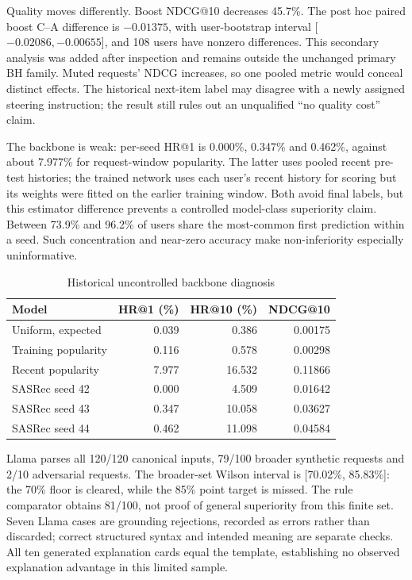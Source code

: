 \documentclass[conference]{IEEEtran}
\begin{document}
Quality moves differently. Boost NDCG@10 decreases 45.7\%. The post hoc paired boost C--A difference is $-0.01375$, with user-bootstrap interval [$-0.02086,-0.00655$], and 108 users have nonzero differences. This secondary analysis was added after inspection and remains outside the unchanged primary BH family. Muted requests' NDCG increases, so one pooled metric would conceal distinct effects. The historical next-item label may disagree with a newly assigned steering instruction; the result still rules out an unqualified ``no quality cost'' claim.

The backbone is weak: per-seed HR@1 is 0.000\%, 0.347\% and 0.462\%, against about 7.977\% for request-window popularity. The latter uses pooled recent pre-test histories; the trained network uses each user's recent history for scoring but its weights were fitted on the earlier training window. Both avoid final labels, but this estimator difference prevents a controlled model-class superiority claim. Between 73.9\% and 96.2\% of users share the most-common first prediction within a seed. Such concentration and near-zero accuracy make non-inferiority especially uninformative.

\begin{table}[t]\centering\small
\caption{Historical uncontrolled backbone diagnosis}
\setlength{\tabcolsep}{3pt}
\begin{tabular}{lrrr}\toprule
Model&HR@1 (\%)&HR@10 (\%)&NDCG@10\\\midrule
Uniform, expected&0.039&0.386&0.00175\\
Training popularity&0.116&0.578&0.00298\\
Recent popularity&7.977&16.532&0.11866\\
SASRec seed 42&0.000&4.509&0.01642\\
SASRec seed 43&0.347&10.058&0.03627\\
SASRec seed 44&0.462&11.098&0.04584\\\bottomrule
\end{tabular}\end{table}

Llama parses all 120/120 canonical inputs, 79/100 broader synthetic requests and 2/10 adversarial requests. The broader-set Wilson interval is [70.02\%, 85.83\%]: the 70\% floor is cleared, while the 85\% point target is missed. The rule comparator obtains 81/100, not proof of general superiority from this finite set. Seven Llama cases are grounding rejections, recorded as errors rather than discarded; correct structured syntax and intended meaning are separate checks. All ten generated explanation cards equal the template, establishing no observed explanation advantage in this limited sample.
\end{document}
